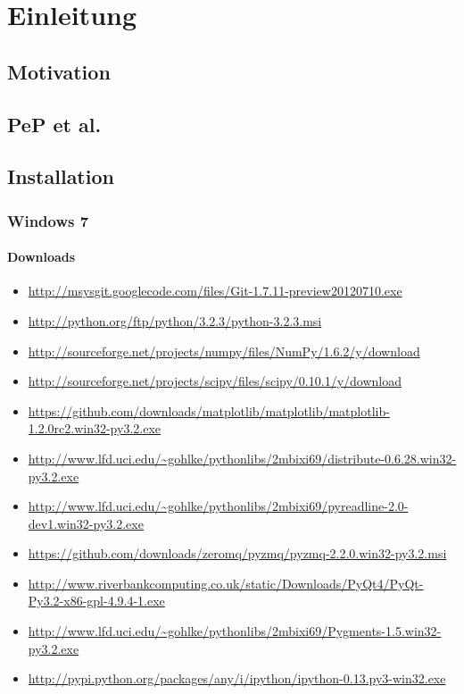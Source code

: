 \chapter{Einleitung}
\section{Motivation}
\section{PeP et al.}

\section{Installation}
\subsection{Windows 7}
\subsubsection{Downloads}
\begin{itemize}
  \item \url{http://msysgit.googlecode.com/files/Git-1.7.11-preview20120710.exe}
  \item \url{http://python.org/ftp/python/3.2.3/python-3.2.3.msi}
	\item \url{http://sourceforge.net/projects/numpy/files/NumPy/1.6.2/y/download}
  \item \url{http://sourceforge.net/projects/scipy/files/scipy/0.10.1/y/download}
	\item \url{https://github.com/downloads/matplotlib/matplotlib/matplotlib-1.2.0rc2.win32-py3.2.exe}
  \item \url{http://www.lfd.uci.edu/~gohlke/pythonlibs/2mbixi69/distribute-0.6.28.win32-py3.2.exe}
	\item \url{http://www.lfd.uci.edu/~gohlke/pythonlibs/2mbixi69/pyreadline-2.0-dev1.win32-py3.2.exe}
  \item \url{https://github.com/downloads/zeromq/pyzmq/pyzmq-2.2.0.win32-py3.2.msi}
	\item \url{http://www.riverbankcomputing.co.uk/static/Downloads/PyQt4/PyQt-Py3.2-x86-gpl-4.9.4-1.exe}
  \item \url{http://www.lfd.uci.edu/~gohlke/pythonlibs/2mbixi69/Pygments-1.5.win32-py3.2.exe}
	\item \url{http://pypi.python.org/packages/any/i/ipython/ipython-0.13.py3-win32.exe}
\end{itemize}

